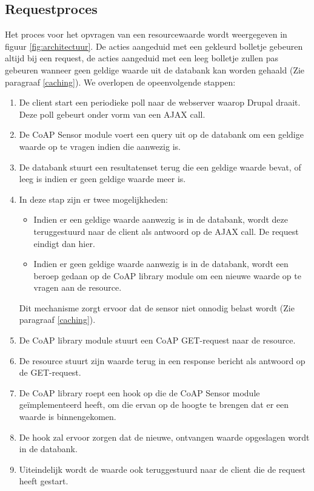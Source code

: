 \subsection{Requestproces}
Het proces voor het opvragen van een resourcewaarde wordt weergegeven in figuur \ref{fig:architectuur}. De acties aangeduid met een gekleurd bolletje gebeuren altijd bij een request, de acties aangeduid met een leeg bolletje zullen pas gebeuren wanneer geen geldige waarde uit de databank kan worden gehaald (Zie paragraaf \ref{caching}). We overlopen de opeenvolgende stappen:
\begin{enumerate}
\item De client start een periodieke poll naar de webserver waarop Drupal draait. Deze poll gebeurt onder vorm van een AJAX call.
\item De CoAP Sensor module voert een query uit op de databank om een geldige waarde op te vragen indien die aanwezig is.
\item De databank stuurt een resultatenset terug die een geldige waarde bevat, of leeg is indien er geen geldige waarde meer is.
\item In deze stap zijn er twee mogelijkheden:
\begin{itemize}
\item Indien er een geldige waarde aanwezig is in de databank, wordt deze teruggestuurd naar de client als antwoord op de AJAX call. De request eindigt dan hier.
\item Indien er geen geldige waarde aanwezig is in de databank, wordt een beroep gedaan op de CoAP library module om een nieuwe waarde op te vragen aan de resource. 
\end{itemize}
Dit mechanisme zorgt ervoor dat de sensor niet onnodig belast wordt (Zie paragraaf \ref{caching}).
\item De CoAP library module stuurt een CoAP GET-request naar de resource.
\item De resource stuurt zijn waarde terug in een response bericht als antwoord op de GET-request.
\item De CoAP library roept een hook op die de CoAP Sensor module ge\"{i}mplementeerd heeft, om die ervan op de hoogte te brengen dat er een waarde is binnengekomen.
\item De hook zal ervoor zorgen dat de nieuwe, ontvangen waarde opgeslagen wordt in de databank.
\item Uiteindelijk wordt de waarde ook teruggestuurd naar de client die de request heeft gestart.
\end{enumerate}
